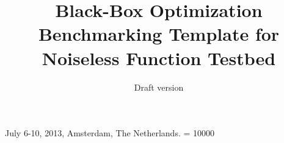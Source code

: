 \documentclass{sig-alternate}
\begin{document}
%
 {July 6-10, 2013, Amsterdam, The Netherlands.}
\widowpenalty = 10000

\title{Black-Box Optimization Benchmarking Template for Noiseless Function
Testbed
}
\subtitle{Draft version
}

%
%
%
%
%
\end{document}
